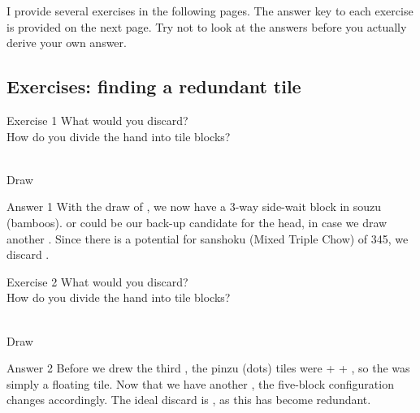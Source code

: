 \bigskip
I provide several exercises in the following pages. The answer key to each exercise is provided on the next page. Try not to look at the answers before you actually derive your own answer. 

\vfill

\subsection*{Exercises: finding a redundant tile}

\bigskip

\begin{itembox}[l]{Exercise 1}
What would you discard? \\
\vsp
How do you divide the hand into tile blocks? 

\bp
{}~\\
\hfill\footnotesize{Draw~~~~~~~~~~~}
\ep
\end{itembox}

\newpage

\begin{itembox}[r]{Answer 1}
\emj
With the draw of {\LARGE{}}, we now have a 3-way side-wait block in {\jap souzu} (bamboos). {\LARGE{}} or {\LARGE{}} could be our back-up candidate for the head, in case we draw another {\LARGE{}}. Since there is a potential for {\jap sanshoku} (Mixed Triple Chow) of 345, we discard {\LARGE{}}. 
\end{itembox}

\vfill

\begin{itembox}[l]{Exercise 2}
What would you discard? \\
\vsp
How do you divide the hand into tile blocks? 

\bp
{}~\\
\hfill\footnotesize{Draw~~~~~~~~~~~}
\ep
\end{itembox}

\newpage


\bigskip
\begin{itembox}[r]{Answer 2}
\emj
Before we drew the third {\LARGE{}}, the {\jap pinzu} (dots) tiles were {\LARGE{} +  + }, so the {\LARGE{}} was simply a floating tile. Now that we have another {\LARGE{}}, the five-block configuration changes accordingly. The ideal discard is {\LARGE{}}, as this has become redundant.
\end{itembox}

